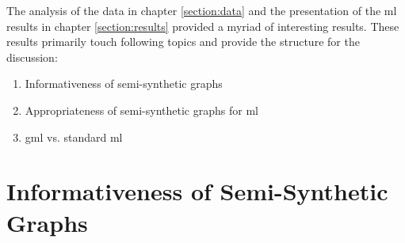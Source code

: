
  The analysis of the data in chapter \ref{section:data} and the presentation
  of the \acs{ml} results in chapter \ref{section:results} provided a
  myriad of interesting results. These results primarily touch following topics
  and provide the structure for the discussion:

  \begin{enumerate}
      \item Informativeness of semi-synthetic graphs
      \item Appropriateness of semi-synthetic graphs for \acs{ml}
      \item \acs{gml} vs. standard \acs{ml}
  \end{enumerate}

  \section[Informativeness of Graphs]{Informativeness of Semi-Synthetic Graphs}
  

